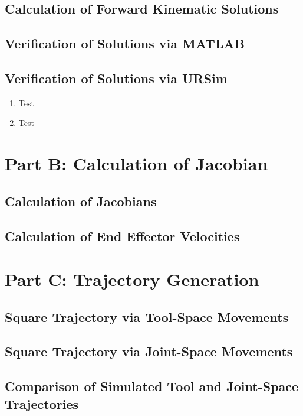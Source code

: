 \documentclass[fleqn]{article}
\begin{document}
\subsection{Calculation of Forward Kinematic Solutions}

\subsection{Verification of Solutions via MATLAB}

\subsection{Verification of Solutions via URSim}

\begin{enumerate}
    \item Test
    \item Test
\end{enumerate}

\section{Part B: Calculation of Jacobian}
\subsection{Calculation of Jacobians}

\subsection{Calculation of End Effector Velocities}

\section{Part C: Trajectory Generation}
\subsection{Square Trajectory via Tool-Space Movements}

\subsection{Square Trajectory via Joint-Space Movements}

\subsection{Comparison of Simulated Tool and Joint-Space Trajectories}
\end{document}
